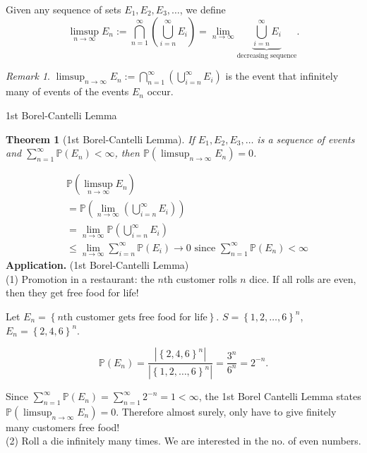 \documentclass[a4paper,11pt]{amsbook}
\makeatletter
\def\section{\@startsection{section}{2}%
    \z@{1\linespacing\@plus1\linespacing}{.5\linespacing}%
    {\large\normalfont\bfseries\centering\color{darkblue}}}
\renewenvironment{proof}[1][\proofname]{\par
    \pushQED{\qed}%
    \normalfont \topsep6\p@\@plus6\p@\relax
    \trivlist
    \itemindent\z@ %
    \item[\hskip\labelsep
          \scshape
      #1\@addpunct{.}]\ignorespaces
}{%
    \popQED\endtrivlist\@endpefalse
}
\newtheorem{theorem}{\hspace{-2em} \color{darkblue} Theorem}[chapter]
\theoremstyle{definition}
\theoremstyle{remark}
\newtheorem{remark}{\hspace{-2em} \color{darkblue} Remark}[chapter]
\renewcommand{\P}{\mathbb{P}}
\newcommand{\abs}[1]{\left|#1\right|}
\newcommand\0{\varnothing}
\makeatother
\begin{document}
    Given any sequence of sets $E_1,E_2,E_3,\ldots$, we define $$\limsup_{n\to\infty}E_n:=\bigcap_{n=1}^\infty\left(\bigcup_{i=n}^\infty E_i\right)
    =\lim_{n\to\infty}\underbrace{\bigcup_{i=n}^\infty E_i}_\text{decreasing sequence}.$$
    \begin{remark} 
        $\limsup_{n\to\infty}E_n:=\bigcap_{n=1}^\infty\left(\bigcup_{i=n}^\infty E_i\right)$ is the event that infinitely many of events of the events $E_n$ occur.
    \end{remark}

    \section{1st Borel-Cantelli Lemma}
    \begin{theorem}[1st Borel-Cantelli Lemma]{}
        If $E_1,E_2,E_3,\ldots$ is a sequence of events and $\sum_{n=1}^\infty\P(E_n)<\infty$,
        then $\P\left(\limsup_{n\to\infty}E_n\right)=0$.
    \end{theorem}
    \begin{proof}
        \begin{align*}
            &\P\left(\limsup_{n\to\infty}E_n\right) \\
            &=\P\left(\lim_{n\to\infty}\left(\bigcup_{i=n}^\infty E_i\right)\right) \tag{continuity} \\
            &=\lim_{n\to\infty}\P\left(\bigcup_{i=n}^\infty E_i\right) \\
            &\leq\lim_{n\to\infty}\sum_{i=n}^\infty\P(E_i)\to0\text{ since }\sum_{n=1}^\infty\P(E_n)<\infty
        \end{align*}
    \end{proof}
    \noindent\textbf{Application.} (1st Borel-Cantelli Lemma)\\
    (1) Promotion in a restaurant: the $n$th customer rolls $n$ dice.
    If all rolls are even, then they get free food for life!

    Let $E_n=\left\{n\text{th customer gets free food for life}\right\}$.
    $S=\left\{1,2,\ldots,6\right\}^n$, $E_n=\left\{2,4,6\right\}^n$.

    $$\P(E_n)=\frac{\abs{\left\{2,4,6\right\}^n}}{\abs{\left\{1,2,\ldots,6\right\}^n}}=\frac{3^n}{6^n}=2^{-n}.$$

    Since $\sum_{n=1}^\infty\P(E_n)=\sum_{n=1}^\infty2^{-n}=1<\infty$,
    the 1st Borel Cantelli Lemma states $\P(\limsup_{n\to\infty}E_n)=0$.
    Therefore almost surely, only have to give finitely many customers free food!\\
    (2) Roll a die infinitely many times. We are interested in the no. of even numbers.
    
\end{document}
